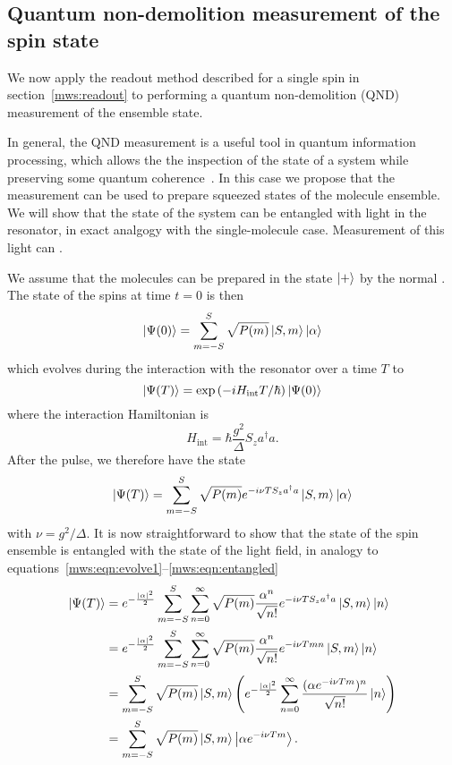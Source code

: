 \subsection{Quantum non-demolition measurement of the spin state}

We now apply the readout method described for a single spin in
section~\ref{mws:readout} to performing a quantum non-demolition (QND)
measurement of the ensemble state.

In general, the QND measurement is a useful tool in quantum information
processing, which allows the the inspection of the state of a system  while
preserving some quantum coherence~\cite{}.
%
In this case we propose that the measurement can be used to prepare squeezed
states of the molecule ensemble.
%
We will show that the state of the system can be entangled with light in the
resonator, in exact analgogy with the single-molecule case. Measurement of this
light can .

We assume that the molecules can be prepared in the state $\ket{+}$ by the
normal . The state of the spins at time $t=0$ is
then
%
\begin{equation}
  \ket{\Psi(0)} = \sum_{m=-S}^S \sqrt{P(m)} \ket{S, m}\ket{\alpha}
\end{equation}
%
which evolves during the interaction with the resonator over a time $T$ to
%
\begin{equation}
  \ket{\Psi(T)} = \exp\left(-iH_\text{int}T/\hbar\right)\ket{\Psi(0)}
\end{equation}
%
where the interaction Hamiltonian is
%
\begin{equation}
  H_\text{int} = \hbar \frac{g^2}{\Delta} S_z a^\dagger a.
\end{equation}
%
After the pulse, we therefore have the state
%
\begin{equation}
  \ket{\Psi(T)} = \sum_{m=-S}^S \sqrt{P(m)} e^{-i\nu T S_z
  a^\dagger a} \ket{S, m}\ket{\alpha}
\end{equation}
%
with $\nu = g^2/\Delta$. It is now straightforward to show that
the state of the spin ensemble is entangled with the state of the light field,
in analogy to equations~\ref{mws:eqn:evolve1}--\ref{mws:eqn:entangled}
%
\begin{align}
  \ket{\Psi(T)} &= e^{-\frac{|\alpha|^2}{2}}\sum_{m=-S}^S \sum_{n=0}^\infty \sqrt{P(m)}
   \frac{\alpha^n}{\sqrt{n!}} e^{-i\nu T S_z a^\dagger a} \ket{S, m} \ket{n}
   \\
  &= e^{-\frac{|\alpha|^2}{2}}\sum_{m=-S}^S \sum_{n=0}^\infty \sqrt{P(m)}
  \frac{\alpha^n}{\sqrt{n!}} e^{-i\nu Tm n} \ket{S, m} \ket{n} \\
  &= \sum_{m=-S}^S \sqrt{P(m)} \ket{S, m} \left( e^{-\frac{|\alpha|^2}{2}}
  \sum_{n=0}^\infty \frac{(\alpha e^{-i\nu T m})^n}{\sqrt{n!}}\ket{n}\right)
  \\
  &= \sum_{m=-S}^S \sqrt{P(m)} \ket{S, m}\ket{\alpha e^{-i\nu T m}}.
\end{align}

